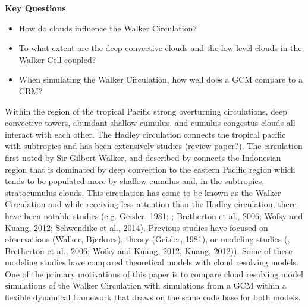 \documentclass[draft]{agujournal2019}
\begin{document}

\textbf{Key Questions}
\begin{itemize}
  \item{How do clouds influence the Walker Circulation?}
  \item{To what extent are the deep convective clouds and the low-level clouds in the Walker Cell coupled?}
  \item{When simulating the Walker Circulation, how well does a GCM compare to a CRM?}  
\end{itemize}

Within the region of the tropical Pacific strong overturning circulations, deep convective towers, abundant shallow 
cumulus, and cumulus congestus clouds all interact with each other.  The Hadley circulation connects the tropical 
pacific with subtropics and has been extensively studies (review paper?).  The circulation first 
  noted by Sir Gilbert Walker, and described by  connects the Indonesian region that is 
  dominated by deep 
  convection to the eastern Pacific region which tends to be populated more by shallow cumulus and, in the 
  subtropics, stratocumulus clouds.  This circulation has come to be 
  known as the Walker Circulation and while receiving less attention than the Hadley circulation, there have been 
  notable studies (e.g. Geisler, 1981; 
  ; Bretherton et al., 
  2006; Wofsy and Kuang, 2012; Schwendike et al., 2014).  Previous studies have focused on observations 
  (Walker, Bjerknes), theory 
  (Geisler, 1981), or modeling studies (, Bretherton et al., 2006; Wofsy and Kuang, 2012, 
  Kuang, 2012)).  Some of these modeling studies have compared theoretical models with cloud
  resolving models.  One of the primary motivations of this paper is to compare cloud resolving model simulations 
  of the Walker Circulation with simulations from a GCM within a flexible dynamical framework that draws on the 
  same code base for both models.  
    
\end{document}
